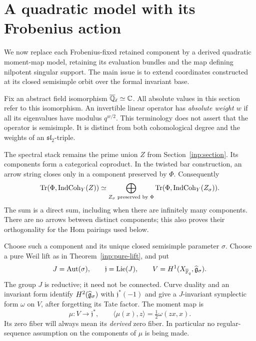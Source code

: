 \section{A quadratic model with its Frobenius action}
\label{mod:section}

We now replace each Frobenius-fixed retained component by a derived
quadratic moment-map model, retaining its evaluation bundles and the map
defining nilpotent singular support. The main issue is to extend
coordinates constructed at its closed semisimple orbit over the formal
invariant base.

Fix an abstract field isomorphism $\overline{\mathbb Q}_{\ell}\simeq\mathbb C$. All absolute values in
this section refer to this isomorphism. An invertible linear operator has
\emph{absolute weight $w$} if all its eigenvalues have modulus $q^{w/2}$.
This terminology does not assert that the operator is semisimple. It is
distinct from both cohomological degree and the weights of an
$\mathfrak{sl}_2$-triple.

The spectral stack remains the prime union $Z$ from
Section~\ref{inp:section}. Its components form a categorical coproduct.
In the twisted bar construction, an arrow string closes only in a
component preserved by $\Phi$. Consequently
\begin{equation}
\label{mod:component-trace}
 \operatorname{Tr}(\Phi,\operatorname{IndCoh}_Y(Z))
 \simeq\bigoplus_{Z_\sigma\text{ preserved by }\Phi}
       \operatorname{Tr}(\Phi,\operatorname{IndCoh}_Y(Z_\sigma)).
\end{equation}
The sum is a direct sum, including when there are infinitely many
components. There are no arrows between distinct components; this also
proves their orthogonality for the Hom pairings used below.

Choose such a component and its unique closed semisimple parameter
$\sigma$. Choose a pure Weil lift as in Theorem~\ref{inp:pure-lift},
and put
\[
 J=\operatorname{Aut}(\sigma),\qquad \mathfrak j=\operatorname{Lie}(J),\qquad
 V=H^1(X_{\overline{\mathbb F}_q},\widehat{\mathfrak g}_\sigma).
\]
The group $J$ is reductive; it need not be connected. Curve duality and
an invariant form identify $H^2(\widehat{\mathfrak g}_\sigma)$ with
$\mathfrak j^*(-1)$ and give a $J$-invariant symplectic form $\omega$ on
$V$, after forgetting its Tate factor. The moment map is
\begin{equation}
\label{mod:moment}
 \mu:V\longrightarrow\mathfrak j^*,\qquad
 \langle\mu(x),z\rangle=\tfrac12\omega(zx,x).
\end{equation}
Its zero fiber will always mean its \emph{derived} zero fiber. In
particular no regular-sequence assumption on the components of $\mu$
is being made.

